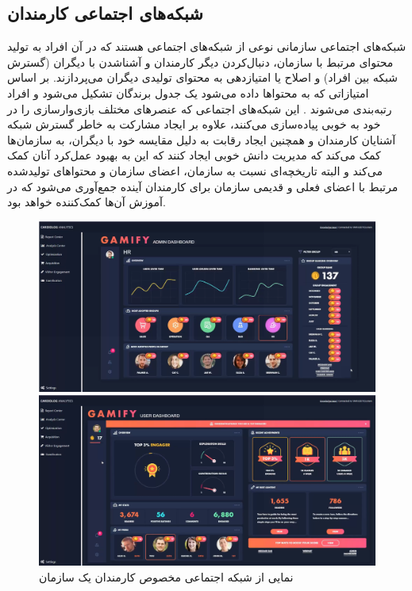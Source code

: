 \subsection{شبکه‌های اجتماعی کارمندان}
\label{sec:socialnetwork}
شبکه‌های اجتماعی سازمانی نوعی از شبکه‌های اجتماعی هستند که در آن افراد به تولید محتوای مرتبط با سازمان، دنبال‌کردن دیگر کارمندان و آشناشدن با دیگران (گسترش شبکه بین افراد) و اصلاح یا امتیازدهی به محتوای تولیدی دیگران می‌پردازند. بر اساس امتیازاتی که به محتواها داده می‌شود یک جدول برندگان تشکیل می‌شود و افراد رتبه‌بندی می‌شوند \cite{sharepoint}.
این شبکه‌های اجتماعی که عنصرهای مختلف بازی‌وارسازی را در خود به خوبی پیاده‌سازی می‌کنند، علاوه بر ایجاد مشارکت به خاطر گسترش شبکه آشنایان کارمندان و همچنین ایجاد رقابت به دلیل مقایسه خود با دیگران، به سازمان‌ها کمک می‌کند که مدیریت دانش خوبی ایجاد کنند که این به بهبود عمل‌کرد آنان کمک می‌کند و البته تاریخچه‌ای نسبت به سازمان، اعضای سازمان و محتواهای تولیدشده مرتبط با اعضای فعلی و قدیمی سازمان برای کارمندان آینده جمع‌آوری می‌شود که در آموزش آن‌ها کمک‌کننده خواهد بود.

\begin{figure}[!htb]
	\centering
	\begin{minipage}[b]{0.49\textwidth}
		\includegraphics[width=\textwidth]{Figures/social1.png}
	\end{minipage}
	\begin{minipage}[b]{0.49\textwidth}
		\includegraphics[width=\textwidth]{Figures/social2.png}
	\end{minipage}
	\caption{نمایی از شبکه اجتماعی مخصوص کارمندان یک سازمان \cite{sharepoint}}
\end{figure}

